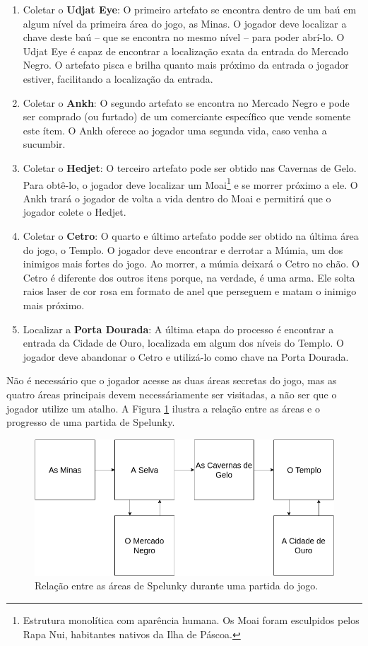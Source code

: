 \begin{enumerate}
	\item Coletar o \textbf{Udjat Eye}: O primeiro artefato se encontra dentro
	de um baú em algum nível da primeira área do jogo, as Minas. O jogador deve
	localizar a chave deste baú -- que se encontra no mesmo nível -- para poder
	abrí-lo. O Udjat Eye é capaz de encontrar a localização exata da entrada do
	Mercado Negro. O artefato pisca e brilha quanto mais próximo da entrada o
	jogador estiver, facilitando a localização da entrada.

	\item Coletar o \textbf{Ankh}: O segundo artefato se encontra no Mercado
	Negro e pode ser comprado (ou furtado) de um comerciante específico que
	vende somente este ítem. O Ankh oferece ao jogador uma segunda vida, caso
	venha a sucumbir.

	\item Coletar o \textbf{Hedjet}: O terceiro artefato pode ser obtido nas
	Cavernas de Gelo. Para obtê-lo, o jogador deve localizar um Moai\footnote{
	Estrutura monolítica com aparência humana. Os Moai foram esculpidos pelos
	Rapa Nui, habitantes nativos da Ilha de Páscoa.} e se morrer próximo a ele.
	O Ankh trará o jogador de volta a vida dentro do Moai e permitirá que o
	jogador colete o Hedjet.

	\item Coletar o \textbf{Cetro}: O quarto e último artefato podde ser obtido
	na última área do jogo, o Templo. O jogador deve encontrar e derrotar a
	Múmia, um dos inimigos mais fortes do jogo. Ao morrer, a múmia deixará o
	Cetro no chão. O Cetro é diferente dos outros itens porque, na verdade, é
	uma arma. Ele solta raios laser de cor rosa em formato de anel que perseguem
	e matam o inimigo mais próximo.

	\item Localizar a \textbf{Porta Dourada}: A última etapa do processo é
	encontrar a entrada da Cidade de Ouro, localizada em algum dos níveis do
	Templo. O jogador deve abandonar o Cetro e utilizá-lo como chave na Porta
	Dourada.
\end{enumerate}

Não é necessário que o jogador acesse as duas áreas secretas do jogo, mas as
quatro áreas principais devem necessáriamente ser visitadas, a não ser que o
jogador utilize um atalho. A Figura \ref{fig:spelunky-run} ilustra a relação
entre as áreas e o progresso de uma partida de Spelunky.

\begin{figure}[htb!]
\centering
\includegraphics[width=.65\textwidth]{fig/spelunky-run.png}
\caption{\label{fig:spelunky-run}Relação entre as áreas de Spelunky durante uma
partida do jogo.}
\end{figure}


